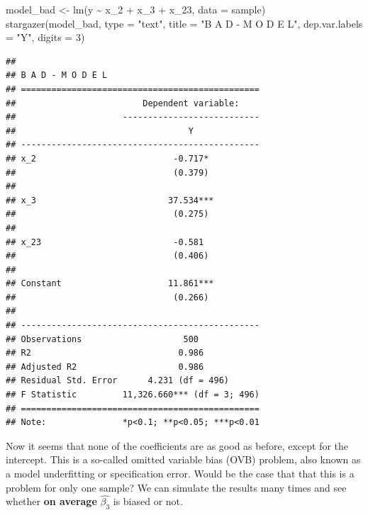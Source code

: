 \documentclass[
]{book}
\newenvironment{Shaded}{\begin{snugshade}}{\end{snugshade}}
\newcommand{\AttributeTok}[1]{\textcolor[rgb]{0.77,0.63,0.00}{#1}}
\newcommand{\DecValTok}[1]{\textcolor[rgb]{0.00,0.00,0.81}{#1}}
\newcommand{\FunctionTok}[1]{\textcolor[rgb]{0.00,0.00,0.00}{#1}}
\newcommand{\NormalTok}[1]{#1}
\newcommand{\OtherTok}[1]{\textcolor[rgb]{0.56,0.35,0.01}{#1}}
\newcommand{\SpecialCharTok}[1]{\textcolor[rgb]{0.00,0.00,0.00}{#1}}
\newcommand{\StringTok}[1]{\textcolor[rgb]{0.31,0.60,0.02}{#1}}
\theoremstyle{definition}
\theoremstyle{definition}
\theoremstyle{definition}
\theoremstyle{definition}
\theoremstyle{remark}
\begin{document}
\begin{Shaded}
\begin{Highlighting}[]
\NormalTok{model\_bad }\OtherTok{\textless{}{-}} \FunctionTok{lm}\NormalTok{(y }\SpecialCharTok{\textasciitilde{}}\NormalTok{ x\_2 }\SpecialCharTok{+}\NormalTok{ x\_3 }\SpecialCharTok{+}\NormalTok{ x\_23, }\AttributeTok{data =}\NormalTok{ sample)}
\FunctionTok{stargazer}\NormalTok{(model\_bad, }\AttributeTok{type =} \StringTok{"text"}\NormalTok{, }\AttributeTok{title =} \StringTok{"B A D {-} M O D E L"}\NormalTok{,}
          \AttributeTok{dep.var.labels =} \StringTok{"Y"}\NormalTok{,}
          \AttributeTok{digits =} \DecValTok{3}\NormalTok{)}
\end{Highlighting}
\end{Shaded}

\begin{verbatim}
## 
## B A D - M O D E L
## ===============================================
##                         Dependent variable:    
##                     ---------------------------
##                                  Y             
## -----------------------------------------------
## x_2                           -0.717*          
##                               (0.379)          
##                                                
## x_3                          37.534***         
##                               (0.275)          
##                                                
## x_23                          -0.581           
##                               (0.406)          
##                                                
## Constant                     11.861***         
##                               (0.266)          
##                                                
## -----------------------------------------------
## Observations                    500            
## R2                             0.986           
## Adjusted R2                    0.986           
## Residual Std. Error      4.231 (df = 496)      
## F Statistic         11,326.660*** (df = 3; 496)
## ===============================================
## Note:               *p<0.1; **p<0.05; ***p<0.01
\end{verbatim}

Now it seems that none of the coefficients are as good as before, except for the intercept. This is a so-called omitted variable bias (OVB) problem, also known as a model underfitting or specification error. Would be the case that that this is a problem for only one sample? We can simulate the results many times and see whether \textbf{on average} \(\hat{\beta_3}\) is biased or not.
\end{document}
